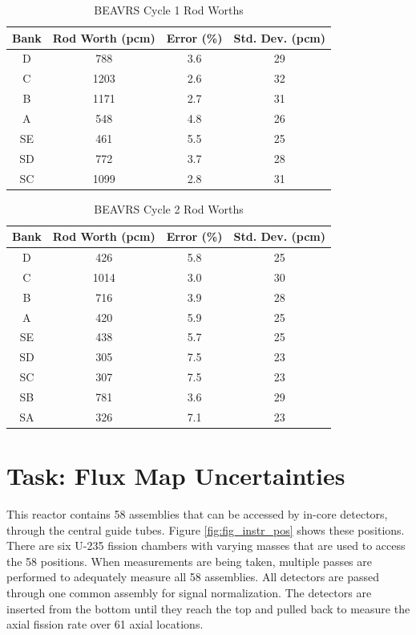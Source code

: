 \documentclass{article}
\begin{document}
\begin{table}[ht]
\centering
\caption{BEAVRS Cycle 1 Rod Worths}
\begin{tabular}{ |c|c|c|c| } 
 \hline
 Bank & Rod Worth (pcm) & Error (\%) & Std. Dev. (pcm) \\  
 \hline
 D & 788 & 3.6 & 29 \\ 
 C & 1203 & 2.6 & 32 \\
 B & 1171 & 2.7 & 31 \\
 A & 548 & 4.8 & 26 \\
 SE & 461 & 5.5 & 25 \\
 SD & 772 & 3.7 & 28 \\
 SC & 1099 & 2.8 & 31 \\
 \hline
 \end{tabular}
\label{tab:cycle1}
\end{table}

\begin{table}[ht]
\centering
\caption{BEAVRS Cycle 2 Rod Worths}
\begin{tabular}{ |c|c|c|c| } 
 \hline
 Bank & Rod Worth (pcm) & Error (\%) & Std. Dev. (pcm) \\  
 \hline
 D & 426 & 5.8 & 25 \\ 
 C & 1014 & 3.0 & 30 \\
 B & 716 & 3.9 & 28 \\
 A & 420 & 5.9 & 25 \\
 SE & 438 & 5.7 & 25 \\
 SD & 305 & 7.5 & 23 \\
 SC & 307 & 7.5 & 23 \\
 SB & 781 & 3.6 & 29 \\
 SA & 326 & 7.1 & 23 \\
 \hline
 \end{tabular}
\label{tab:cycle2}
\end{table}

\section{Task: Flux Map Uncertainties}
\label{flux_map_unc}

This reactor contains 58 assemblies that can be accessed by in-core detectors, through the central guide tubes.  Figure \ref{fig:fig_instr_pos} shows these positions. There are six U-235 fission chambers with varying masses that are used to access the 58 positions. When measurements are being taken, multiple passes are performed to adequately measure all 58 assemblies. All detectors are passed through one common assembly for signal normalization. The detectors are inserted from the bottom until they reach the top and pulled back to measure the axial fission rate over 61 axial locations.
\end{document}
